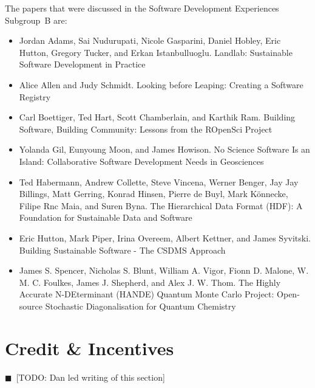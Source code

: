 \documentclass[11pt, oneside]{amsart}
\newcommand{\todo}[1]{{\color{blue}$\blacksquare$~\textsf{[TODO: #1]}}}
\begin{document}
The papers that were discussed in the Software Development Experiences Subgroup~B are:

\begin{itemize}

\item Jordan Adams, Sai Nudurupati, Nicole Gasparini, Daniel Hobley, Eric
Hutton, Gregory Tucker, and Erkan Istanbulluoglu. Landlab: Sustainable Software
Development in Practice ~\cite{wssspe2_adams}

\item Alice Allen and Judy Schmidt. Looking before Leaping: Creating a Software
Registry~\cite{wssspe2_allen}

\item Carl Boettiger, Ted Hart, Scott Chamberlain, and Karthik Ram. Building
Software, Building Community: Lessons from the {ROpenSci} Project~\cite{wssspe2_boettiger}

\item Yolanda Gil, Eunyoung Moon, and James Howison. No Science Software Is an
Island: Collaborative Software Development Needs in
Geosciences~\cite{wssspe2_gil}

\item Ted Habermann, Andrew Collette, Steve Vincena, Werner Benger, Jay Jay
Billings, Matt Gerring, Konrad Hinsen, Pierre de Buyl, Mark K\"{o}nnecke, Filipe
Rnc Maia, and Suren Byna. The Hierarchical Data Format ({HDF}): A Foundation for
Sustainable Data and Software~\cite{wssspe2_habermann}

\item Eric Hutton, Mark Piper, Irina Overeem, Albert Kettner, and James Syvitski.
Building Sustainable Software - The {CSDMS} Approach~\cite{wssspe2_hutton}

\item James S. Spencer, Nicholas S. Blunt, William A. Vigor, Fionn D. Malone, W.
M. C. Foulkes, James J. Shepherd, and Alex J. W. Thom. The {H}ighly {A}ccurate
{N-DE}terminant ({HANDE}) Quantum {Monte Carlo} Project: Open-source Stochastic
Diagonalisation for Quantum Chemistry~\cite{wssspe2_spencer}
\end{itemize}

\section{Credit \& Incentives} \label{sec:credit}
\todo{Dan led writing of this section}
\end{document}
